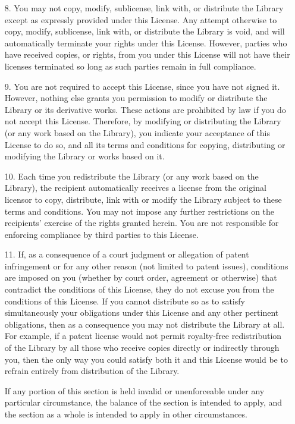 \begin{itemize}
\item[8.]  You may not copy, modify, sublicense, link with, or distribute
the Library except as expressly provided under this License.  Any
attempt otherwise to copy, modify, sublicense, link with, or
distribute the Library is void, and will automatically terminate your
rights under this License.  However, parties who have received copies,
or rights, from you under this License will not have their licenses
terminated so long as such parties remain in full compliance.

\item[9.]  You are not required to accept this License, since you have not
signed it.  However, nothing else grants you permission to modify or
distribute the Library or its derivative works.  These actions are
prohibited by law if you do not accept this License.  Therefore, by
modifying or distributing the Library (or any work based on the
Library), you indicate your acceptance of this License to do so, and
all its terms and conditions for copying, distributing or modifying
the Library or works based on it.

\item[10.]  Each time you redistribute the Library (or any work based on the
Library), the recipient automatically receives a license from the
original licensor to copy, distribute, link with or modify the Library
subject to these terms and conditions.  You may not impose any further
restrictions on the recipients' exercise of the rights granted herein.
You are not responsible for enforcing compliance by third parties to
this License.

\item[11.] If, as a consequence of a court judgment or allegation of patent
infringement or for any other reason (not limited to patent issues),
conditions are imposed on you (whether by court order, agreement or
otherwise) that contradict the conditions of this License, they do not
excuse you from the conditions of this License.  If you cannot
distribute so as to satisfy simultaneously your obligations under this
License and any other pertinent obligations, then as a consequence you
may not distribute the Library at all.  For example, if a patent
license would not permit royalty-free redistribution of the Library by
all those who receive copies directly or indirectly through you, then
the only way you could satisfy both it and this License would be to
refrain entirely from distribution of the Library.

If any portion of this section is held invalid or unenforceable under any
particular circumstance, the balance of the section is intended to apply,
and the section as a whole is intended to apply in other circumstances.


\end{itemize}
